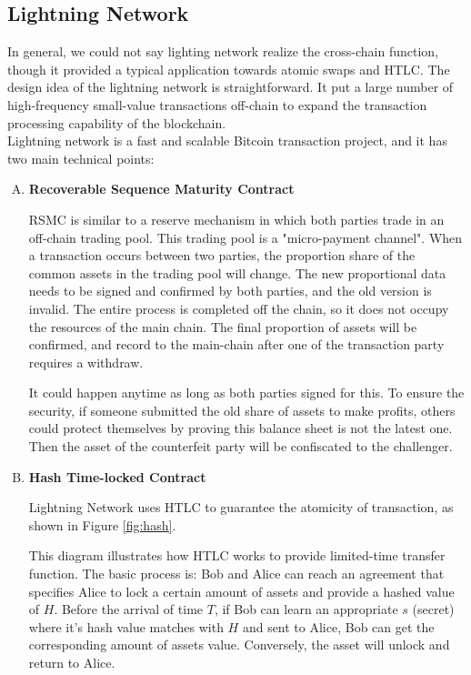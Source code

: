 \subsection{Lightning Network}
\noindent In general, we could not say lighting network realize the cross-chain function, though it provided a typical application towards atomic swaps and HTLC. The design idea of the lightning network is straightforward. It put a large number of high-frequency small-value transactions off-chain to expand the transaction processing capability of the blockchain.\\
\noindent Lightning network\cite{poon2016bitcoin} is a fast and scalable Bitcoin transaction project, and it has two main technical points:
\begin{enumerate}[A.]
    \item \textbf{Recoverable Sequence Maturity Contract} 
    
    	RSMC is similar to a reserve mechanism in which both parties trade in an
    	off-chain trading pool. This trading pool is a "micro-payment channel".
    	When a transaction occurs between two parties, the proportion share of the
    	common assets in the trading pool will change. The new proportional data
    	needs to be signed and confirmed by both parties, and the old version is invalid. The entire process is completed off the chain,
    	so it does not occupy the resources of the main chain. The final
    	proportion of assets will be confirmed, and record to the main-chain after
    	one of the transaction party requires a withdraw.
    	
    	It could happen anytime as long as both parties signed for this. To ensure
    	the security, if someone submitted the old share of assets to make
    	profits, others could protect themselves by proving this balance sheet is
    	not the latest one. Then the asset of the counterfeit party will be
    	confiscated to the challenger.
    \item \textbf{Hash Time-locked Contract}
    
     Lightning Network uses HTLC to guarantee the atomicity of transaction, as
     shown in Figure \ref{fig:hash}. 
     
     This diagram illustrates how HTLC works to
     provide limited-time transfer function. The basic process is: Bob and Alice
     can reach an agreement that specifies Alice to lock a certain amount of
     assets and provide a hashed value of $H$. Before the arrival of time $T$, if
     Bob can learn an appropriate $s$ (secret) where it's hash value matches with
     $H$ and sent to Alice, Bob can get the corresponding amount of assets value.
     Conversely, the asset will unlock and return to Alice.
\end{enumerate}
